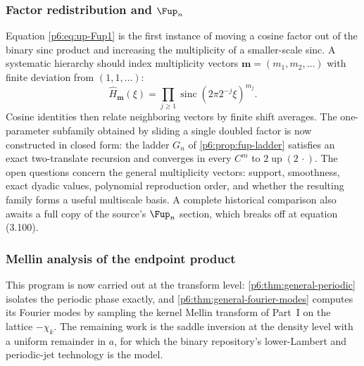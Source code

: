 \documentclass[11pt,oneside]{article}
\numberwithin{equation}{section}
\theoremstyle{definition}
\theoremstyle{remark}
\newcommand{\Up}{\operatorname{up}}
\newcommand{\sinc}{\operatorname{sinc}}
\begin{document}
\subsubsection{Factor redistribution and \texorpdfstring{$\Fup_n$}{Fup-n}}
Equation \eqref{p6:eq:up-Fup1} is the first instance of moving a cosine factor out
of the binary sinc product and increasing the multiplicity of a smaller-scale
sinc.  A systematic hierarchy should index multiplicity vectors
$\boldsymbol m=(m_1,m_2,\ldots)$ with finite deviation from $(1,1,\ldots)$:
\[
 \widehat H_{\boldsymbol m}(\xi)
 =\prod_{j\ge1}\sinc(2\pi2^{-j}\xi)^{m_j}.
\]
Cosine identities then relate neighboring vectors by finite shift averages.
The one-parameter subfamily obtained by sliding a single doubled factor is now
constructed in closed form: the ladder $G_n$ of \cref{p6:prop:fup-ladder}
satisfies an exact two-translate recursion and converges in every $C^m$ to
$2\Up(2\,\cdot)$.  The open questions concern the general multiplicity
vectors: support, smoothness, exact dyadic values, polynomial reproduction
order, and whether the resulting family forms a useful multiscale basis.
A complete historical comparison also awaits a full copy of the source's
$\Fup_n$ section, which breaks off at equation (3.100).

\subsubsection{Mellin analysis of the endpoint product}
This program is now carried out at the transform level:
\cref{p6:thm:general-periodic} isolates the periodic phase exactly, and
\cref{p6:thm:general-fourier-modes} computes its Fourier modes by sampling the
kernel Mellin transform of Part~I on the lattice $-\chi_k$.  The remaining
work is the saddle inversion at the density level with a uniform remainder in
$a$, for which the binary repository's lower-Lambert and periodic-jet
technology is the model.
\end{document}

